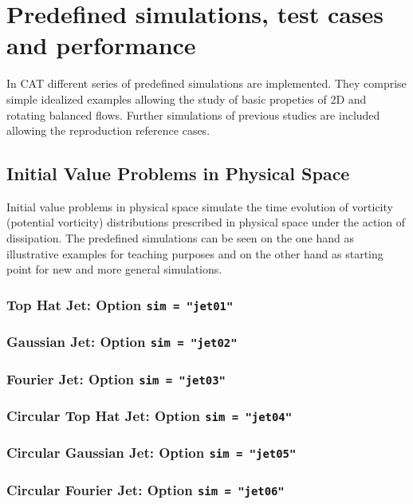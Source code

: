 \chapter{Predefined simulations, test cases and performance}

In CAT different series of predefined simulations are implemented. 
They comprise simple idealized examples allowing the study of basic 
propeties of 2D and rotating balanced flows. Further simulations of
previous studies are included  allowing the reproduction   reference cases. 

\section{Initial Value Problems in Physical Space}

Initial value problems in physical space simulate the time evolution
of vorticity (potential vorticity) distributions prescribed in physical 
space under the action of dissipation. The predefined simulations can
be seen on the one hand as illustrative examples for teaching purposes 
and on the other hand as starting point for new and more general 
simulations.

\subsection{Top Hat Jet: Option {\tt sim = "jet01"}}

\subsection{Gaussian Jet: Option {\tt sim = "jet02"}}

\subsection{Fourier Jet: Option {\tt sim = "jet03"}}

\subsection{Circular Top Hat Jet: Option {\tt sim = "jet04"}}

\subsection{Circular Gaussian Jet: Option {\tt sim = "jet05"}}

\subsection{Circular Fourier Jet: Option {\tt sim = "jet06"}}

